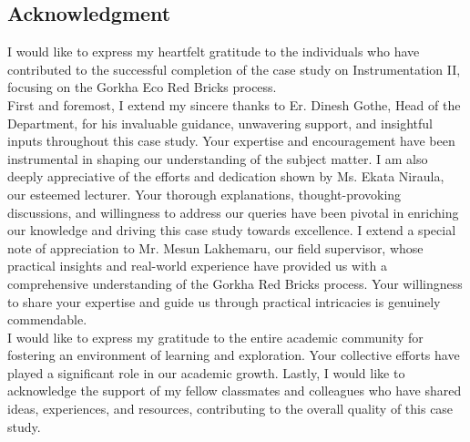 \begin{center}
\section*{Acknowledgment}
\end{center}
I would like to express my heartfelt gratitude to the individuals who have contributed to the successful completion of the case study on Instrumentation II, focusing on the Gorkha Eco Red Bricks process.
\vspace{0.4cm} \\
First and foremost, I extend my sincere thanks to Er. Dinesh Gothe, Head of the Department, for his invaluable guidance, unwavering support, and insightful inputs throughout this case study. Your expertise and encouragement have been instrumental in shaping our understanding of the subject matter.
I am also deeply appreciative of the efforts and dedication shown by Ms. Ekata Niraula, our esteemed lecturer. Your thorough explanations, thought-provoking discussions, and willingness to address our queries have been pivotal in enriching our knowledge and driving this case study towards excellence.
I extend a special note of appreciation to Mr. Mesun Lakhemaru, our field supervisor, whose practical insights and real-world experience have provided us with a comprehensive understanding of the Gorkha Red Bricks process. Your willingness to share your expertise and guide us through practical intricacies is genuinely commendable.
\vspace{0.4cm} \\
I would like to express my gratitude to the entire academic community for fostering an environment of learning and exploration. Your collective efforts have played a significant role in our academic growth.
Lastly, I would like to acknowledge the support of my fellow classmates and colleagues who have shared ideas, experiences, and resources, contributing to the overall quality of this case study.

